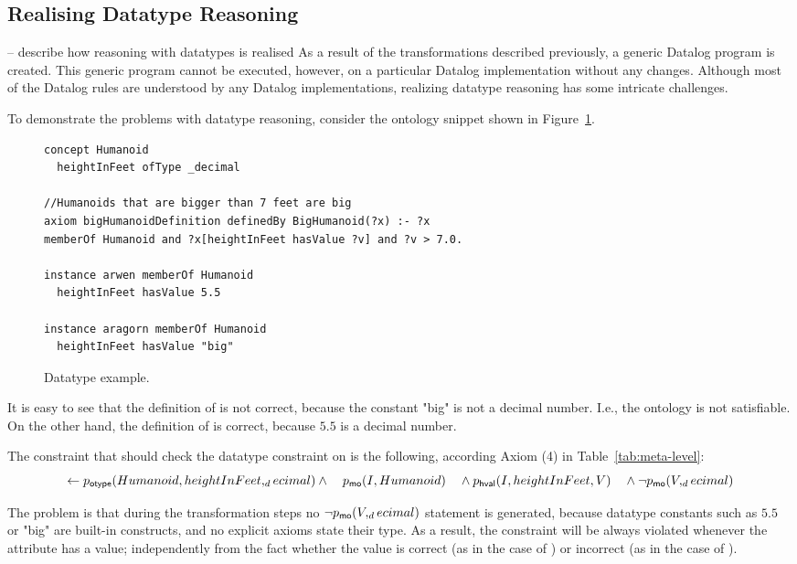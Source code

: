 \subsection{Realising Datatype Reasoning}
-- describe how reasoning with datatypes is realised As a result
of the transformations described previously, a generic Datalog
program is created. This generic program cannot be executed,
however, on a particular Datalog implementation without any
changes. Although most of the Datalog rules are understood by any
Datalog implementations, realizing datatype reasoning has some
intricate challenges.

To demonstrate the problems with datatype reasoning, consider the
ontology snippet shown in Figure~\ref{fig:datatype_example}.

\begin{figure}[hbt]
\centering
\begin{lstlisting}[style=wsml, frame=none]
concept Humanoid
  heightInFeet ofType _decimal

//Humanoids that are bigger than 7 feet are big
axiom bigHumanoidDefinition definedBy BigHumanoid(?x) :- ?x
memberOf Humanoid and ?x[heightInFeet hasValue ?v] and ?v > 7.0.

instance arwen memberOf Humanoid
  heightInFeet hasValue 5.5

instance aragorn memberOf Humanoid
  heightInFeet hasValue "big"
\end{lstlisting}
 \caption{Datatype example. \label{fig:datatype_example}}
\end{figure}

It is easy to see that the definition of  is not
correct, because the constant "big" is not a decimal number. I.e.,
the ontology is not satisfiable. On the other hand, the definition
of  is correct, because $5.5$ is a decimal number.

The constraint that should check the datatype constraint on
 is the following, according Axiom (4) in
Table~\ref{tab:meta-level}:
\begin{displaymath}
    \leftarrow p_{\mathrm{\sf otype}}(Humanoid,heightInFeet,_decimal) \wedge \\
    \phantom{\leftarrow} p_{\mathrm{\sf mo}}(I,Humanoid) \\
  \phantom{\leftarrow} \wedge p_{\mathrm{\sf hval}}(I,heightInFeet,V) \\
  \phantom{\leftarrow} \wedge \neg p_{\mathrm{\sf mo}}(V,_decimal)
\end{displaymath}

The problem is that during the transformation steps no $\neg
p_{\mathrm{\sf mo}}(V,_decimal)$ statement is generated, because datatype
constants such as $5.5$ or "big" are built-in constructs, and no
explicit axioms state their type. As a result, the constraint will
be always violated whenever the  attribute has a
value; independently from the fact whether the value is correct
(as in the case of ) or incorrect (as in the case of
).

